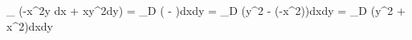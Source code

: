 \oint_{\gamma} (-x^2y \;dx + xy^2\;dy) =
\iint_{D}
\left(
 - 
\right)dxdy =
\iint_{D} (y^2 - (-x^2))dxdy =
\iint_{D} (y^2 + x^2)dxdy